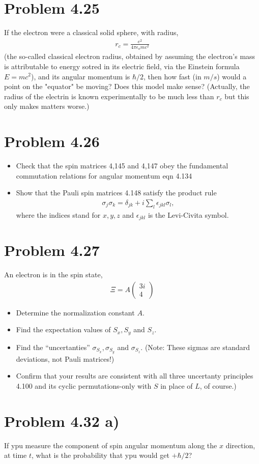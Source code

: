 \documentclass[../main.tex]{subfiles}
\begin{document}
\section{Problem 4.25}

If the electron were a classical solid sphere, with radius,
\begin{gather*}
    r_c = \frac{e^2}{4\pi\epsilon_omc^2}
\end{gather*}
(the so-called classical electron radius, obtained by assuming the electron's mass is attributable to energy sotred in its electric field, via the Einstein formula $E=mc^2$),
and its angular momentum is $\hbar/2$, then how fast (in $m/s$) would a point on the "equator" be moving?
Does this model make sense?
(Actually, the radius of the electrin is known experimentally to be much less than $r_c$ but this only makes matters worse.)

\section{Problem 4.26}

\begin{itemize}
    \item Check that the spin matrices 4,145 and 4,147 obey the fundamental commutation relations for angular momentum eqn 4.134
    \item Show that the Pauli spin matrices 4.148 satisfy the product rule 
        \begin{gather*}
            \sigma_j\sigma_k=\delta_{jk}+i\sum_l\epsilon_{jkl}\sigma_l,
        \end{gather*}
        where the indices stand for $x,y,z$ and $\epsilon_{jkl}$ is the Levi-Civita symbol.
\end{itemize}

\section{Problem 4.27}

An electron is in the spin state,
\begin{gather*}
    \Xi=A\begin{pmatrix}3i\\4\end{pmatrix}
\end{gather*}

\begin{itemize}
    \item Determine the normalization constant $A$.
    \item Find the expectation values of $S_x, S_y$ and $S_z$.
    \item Find the ``uncertanties'' $\sigma_{S_x},\sigma_{S_y}$ and $\sigma_{S_z}$. (Note: These sigmas are standard deviations, not Pauli matrices!)
    \item Confirm that your results are consistent with all three uncertanty principles 4.100 and its cyclic permutations-only with $S$ in place of $L$, of course.)
\end{itemize}

\section{Problem 4.32 a)}

If ypu measure the component of spin angular momentum along the $x$ direction, at time $t$, what is the probability that ypu would get $+\hbar/2$?
\end{document}
